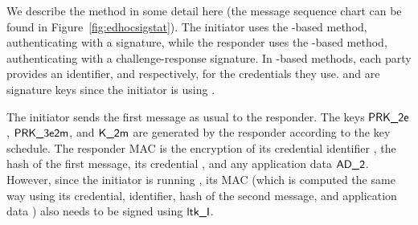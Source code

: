 %
%

We describe the \mSigStat{} method in some detail here (the message sequence chart can be found in Figure~\ref{fig:edhocsigstat}). The initiator uses the \mSig{}-based method, authenticating with a signature,
while the responder uses the \mStat{}-based method, authenticating with a
challenge-response signature.
%
In \mStat{}-based methods, each party provides an identifier, \mIdcredi{} and \mIdcredr{} respectively, for the credentials they use.
%
%
\mCredi{} and \mLtki{} are signature keys since the initiator is using
\mSig.

The initiator sends the first message as usual to the responder. The keys $\textsf{PRK\_2e}$, $\textsf{PRK\_3e2m}$, and $\textsf{K\_2m}$ are generated by the responder according to the key schedule. The responder MAC is the \mAead{} encryption of its credential identifier \mIdcredr{}, the hash of the first message, its credential \mCredr{}, and any application data $\textsf{AD\_2}$. However, since the initiator is running \mSig{}, its MAC (which is computed the same way using its credential, identifier, hash of the second message, and application data \mADthree) also needs to be signed using $\textsf{ltk\_I}$. %

